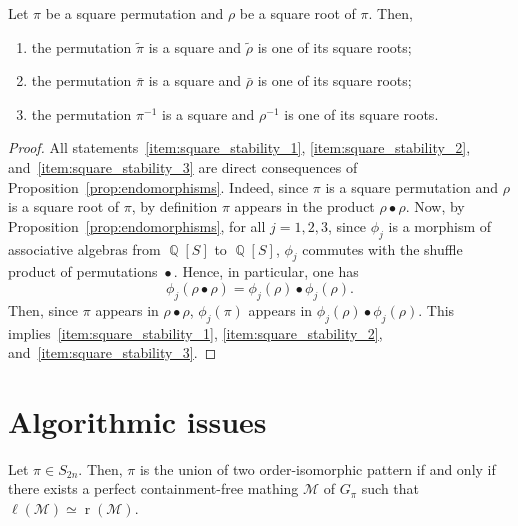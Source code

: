 \documentclass[a4paper,10pt]{llncs}
\DeclareMathOperator{\LEFT}{\ell}
\DeclareMathOperator{\RIGHT}{r}
\DeclareMathOperator{\QQ}{\mathbb{Q}}
\DeclareMathOperator{\SHUFFLE}{\bullet}
\begin{document}
\begin{proposition} \label{prop:square_stability}
    Let $\pi$ be a square permutation and $\rho$ be a square root of
    $\pi$. Then,
    \begin{enumerate}[label={\it (\roman*)},fullwidth]
        \item \label{item:square_stability_1}
        the permutation $\widetilde{\pi}$ is a square and
        $\widetilde{\rho}$ is one of its square roots;
        \item \label{item:square_stability_2}
        the permutation $\bar \pi$ is a square and $\bar \rho$ is one of
        its square roots;
        \item \label{item:square_stability_3}
        the permutation $\pi^{-1}$ is a square and $\rho^{-1}$ is one of
        its square roots.
    \end{enumerate}
\end{proposition}
\begin{proof}
    All statements~\ref{item:square_stability_1},
    \ref{item:square_stability_2}, and~\ref{item:square_stability_3} are
    direct consequences of Proposition~\ref{prop:endomorphisms}. Indeed,
    since $\pi$ is a square permutation and $\rho$ is a square root of
    $\pi$, by definition $\pi$ appears in the product
    $\rho \SHUFFLE \rho$. Now, by Proposition~\ref{prop:endomorphisms},
    for all $j = 1, 2, 3$, since $\phi_j$ is a morphism of associative
    algebras from $\QQ[S]$ to $\QQ[S]$, $\phi_j$ commutes with the
    shuffle product of permutations $\SHUFFLE$. Hence, in particular,
    one has
    \begin{equation}
        \phi_j(\rho \SHUFFLE \rho) =
        \phi_j(\rho) \SHUFFLE \phi_j(\rho).
    \end{equation}
    Then, since $\pi$ appears in $\rho \SHUFFLE \rho$, $\phi_j(\pi)$
    appears in $\phi_j(\rho) \SHUFFLE \phi_j(\rho)$. This
    implies~\ref{item:square_stability_1}, \ref{item:square_stability_2},
    and~\ref{item:square_stability_3}.
\end{proof}
\medskip


\section{Algorithmic issues}
\label{section:Algorithmic issues}


\begin{proposition}
Let $\pi \in S_{2n}$.
Then,
$\pi$ is the union of two order-isomorphic pattern
if and only if
there exists a perfect containment-free mathing
$\mathcal{M}$ of $G_\pi$ such that
$\LEFT(\mathcal{M}) \simeq \RIGHT(\mathcal{M})$.
\end{proposition}
\end{document}
